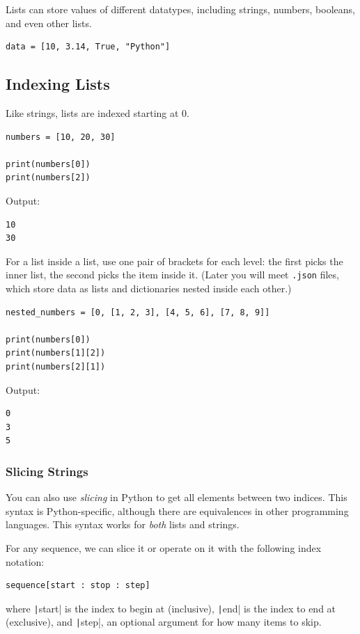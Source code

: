 Lists can store values of different datatypes, including strings, numbers, booleans, and even other lists.

\begin{verbatim}
data = [10, 3.14, True, "Python"]
\end{verbatim}

\subsection{Indexing Lists}

Like strings, lists are indexed starting at 0.

\begin{verbatim}
numbers = [10, 20, 30]

print(numbers[0])
print(numbers[2])
\end{verbatim}

Output:
\begin{verbatim}
10
30
\end{verbatim}

For a list inside a list, use one pair of brackets for each level: the first picks the inner list, the second picks the item inside it. (Later you will meet \texttt{.json} files, which store data as lists and dictionaries nested inside each other.) 
\begin{verbatim}
nested_numbers = [0, [1, 2, 3], [4, 5, 6], [7, 8, 9]]

print(numbers[0])
print(numbers[1][2])
print(numbers[2][1])
\end{verbatim}

Output:
\begin{verbatim}
0
3
5
\end{verbatim}
\subsubsection{Slicing Strings}
You can also use \emph{slicing} in Python to get all elements between two indices. 
This syntax is Python-specific, although there are equivalences in other programming languages. 
This syntax works for \emph{both} lists and strings.

For any sequence, we can slice it or operate on it with the following index notation:
\begin{verbatim}
sequence[start : stop : step]
\end{verbatim}
where \texttt|start| is the index to begin at (inclusive), \texttt|end| is the index to end at (exclusive), and \texttt|step|, an optional argument for how many items to skip.

